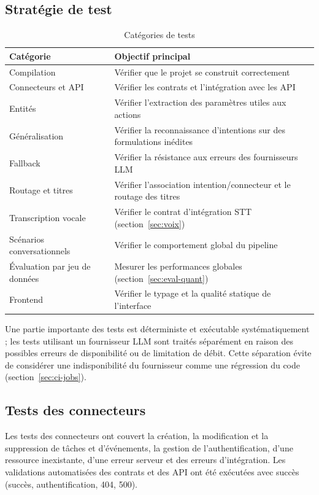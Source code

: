 \documentclass[11pt,a4paper,openany,oneside]{report}
\begin{document}
\subsection{Stratégie de test}
\begin{table}[htbp]
\centering\small
\caption{Catégories de tests}\label{tab:tests-cat}
\begin{tabularx}{\textwidth}{@{}p{4.6cm}X@{}}
\toprule
\textbf{Catégorie} & \textbf{Objectif principal} \\
\midrule
Compilation & Vérifier que le projet se construit correctement \\
Connecteurs et API & Vérifier les contrats et l'intégration avec les API \\
Entités & Vérifier l'extraction des paramètres utiles aux actions \\
Généralisation & Vérifier la reconnaissance d'intentions sur des formulations inédites \\
Fallback & Vérifier la résistance aux erreurs des fournisseurs LLM \\
Routage et titres & Vérifier l'association intention/connecteur et le routage des titres \\
Transcription vocale & Vérifier le contrat d'intégration STT (section~\ref{sec:voix}) \\
Scénarios conversationnels & Vérifier le comportement global du pipeline \\
Évaluation par jeu de données & Mesurer les performances globales (section~\ref{sec:eval-quant}) \\
Frontend & Vérifier le typage et la qualité statique de l'interface \\
\bottomrule
\end{tabularx}
\end{table}

Une partie importante des tests est déterministe et exécutable systématiquement ; les tests utilisant un fournisseur LLM sont traités séparément en raison des possibles erreurs de disponibilité ou de limitation de débit. Cette séparation évite de considérer une indisponibilité du fournisseur comme une régression du code (section~\ref{sec:ci-jobs}).

\subsection{Tests des connecteurs}
Les tests des connecteurs ont couvert la création, la modification et la suppression de tâches et d'événements, la gestion de l'authentification, d'une ressource inexistante, d'une erreur serveur et des erreurs d'intégration. Les validations automatisées des contrats et des API ont été exécutées avec succès (succès, authentification, 404, 500).
\end{document}
